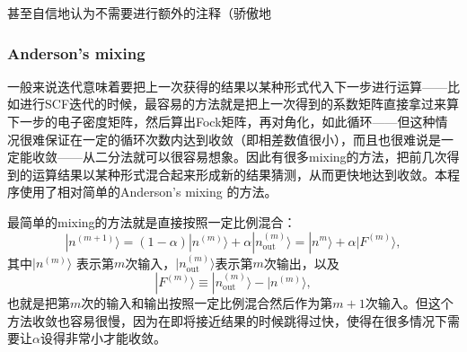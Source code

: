 \documentclass[12pt,a4paper,openany,twoside]{article}
\numberwithin{equation}{section}
\begin{document}
                甚至自信地认为不需要进行额外的注释（骄傲地

                \subsubsection{Anderson's mixing}
                一般来说迭代意味着要把上一次获得的结果以某种形式代入下一步进行运算——比如进行SCF迭代的时候，最容易的方法就是把上一次得到的系数矩阵直接拿过来算下一步的电子密度矩阵，然后算出Fock矩阵，再对角化，如此循环——但这种情况很难保证在一定的循环次数内达到收敛（即相差数值很小），而且也很难说是一定能收敛——从二分法就可以很容易想象。因此有很多mixing的方法，把前几次得到的运算结果以某种形式混合起来形成新的结果猜测，从而更快地达到收敛。本程序使用了相对简单的Anderson's mixing 的方法\cite{johnson1988modified}。

                最简单的mixing的方法就是直接按照一定比例混合：
                \begin{equation}
                    |n^{(m+1)}\rangle = (1-\alpha) |n^{(m)}\rangle + \alpha | n_{\text{out}}^{(m)} \rangle = |n^{m} \rangle + \alpha | F^{(m)} \rangle,
                \end{equation}
                其中$|n^{(m)}\rangle$ 表示第$m$次输入，$|n^{(m)}_\text{out}\rangle$表示第$m$次输出，以及
                \begin{equation}
                    |F^{(m)}\rangle \equiv |n_\text{out}^{(m)} \rangle - |n^{(m)}\rangle,
                \end{equation}
                也就是把第$m$次的输入和输出按照一定比例混合然后作为第$m+1$次输入。但这个方法收敛也容易很慢，因为在即将接近结果的时候跳得过快，使得在很多情况下需要让$\alpha$设得非常小才能收敛。
\end{document}
